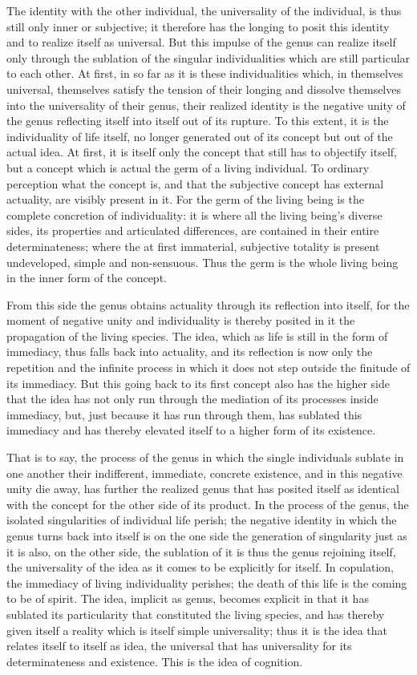 The identity with the other individual,
the universality of the individual,
is thus still only inner or subjective;
it therefore has the longing to posit
this identity and to realize itself as universal.
But this impulse of the genus can realize itself
only through the sublation of the singular individualities
which are still particular to each other.
At first, in so far as it is these individualities
which, in themselves universal, themselves satisfy
the tension of their longing and dissolve themselves
into the universality of their genus,
their realized identity is
the negative unity of the genus
reflecting itself into itself out of its rupture.
To this extent, it is the individuality of life itself,
no longer generated out of its concept
but out of the actual idea.
At first, it is itself only the concept
that still has to objectify itself,
but a concept which is actual
the germ of a living individual.
To ordinary perception what the concept is,
and that the subjective concept has external actuality,
are visibly present in it.
For the germ of the living being is
the complete concretion of individuality:
it is where all the living being's diverse sides,
its properties and articulated differences,
are contained in their entire determinateness;
where the at first immaterial, subjective totality is
present undeveloped, simple and non-sensuous.
Thus the germ is the whole living being
in the inner form of the concept.

From this side the genus obtains actuality
through its reflection into itself,
for the moment of negative unity
and individuality is thereby posited in it
the propagation of the living species.
The idea, which as life is still
in the form of immediacy,
thus falls back into actuality,
and its reflection is now only
the repetition and the infinite process
in which it does not step outside
the finitude of its immediacy.
But this going back to its first concept also has
the higher side that the idea has not only run through
the mediation of its processes inside immediacy,
but, just because it has run through them,
has sublated this immediacy
and has thereby elevated itself
to a higher form of its existence.

That is to say, the process of the genus
in which the single individuals sublate in one another
their indifferent, immediate, concrete existence,
and in this negative unity die away,
has further the realized genus
that has posited itself as identical
with the concept for the other side of its product.
In the process of the genus,
the isolated singularities of individual life perish;
the negative identity in which
the genus turns back into itself is
on the one side the generation of
singularity just as it is also,
on the other side, the sublation of it
is thus the genus rejoining itself,
the universality of the idea as
it comes to be explicitly for itself.
In copulation, the immediacy of
living individuality perishes;
the death of this life is
the coming to be of spirit.
The idea, implicit as genus, becomes explicit
in that it has sublated its particularity
that constituted the living species,
and has thereby given itself a reality
which is itself simple universality;
thus it is the idea that relates
itself to itself as idea,
the universal that has universality
for its determinateness and existence.
This is the idea of cognition.
